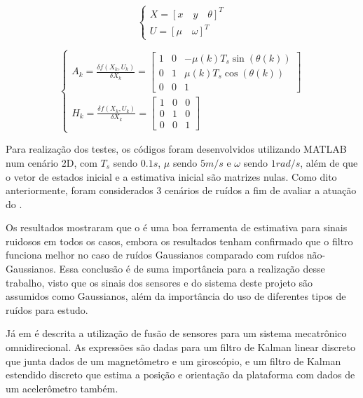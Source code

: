 \documentclass[acronym, symbols, table]{fei}
\begin{document}
\begin{equation}\label{eq:trab_relacionados_vetor_estados_1}
	\begin{cases}
		X = [x \quad y \quad \theta]^T \\
		U = [\mu \quad \omega]^T
	\end{cases}
\end{equation}

\begin{equation}\label{eq:trab_relacionados_matrizes_jacobianas}
	\begin{cases}
		A_k = \frac{\delta f(X_k, U_k)}{\delta X_k} = \begin{bmatrix}
			1 & 0 & -\mu(k)T_s\sin{(\theta(k))} \\
			0 & 1 & \mu(k)T_s\cos{(\theta(k))}  \\
			0 & 0 & 1
		\end{bmatrix} \\[30pt]
		
		H_k = \frac{\delta f(X_k, U_k)}{\delta X_k} = 
		\begin{bmatrix}
			1 & 0 & 0 \\
			0 & 1 & 0 \\
			0 & 0 & 1 
		\end{bmatrix}		
	\end{cases}
\end{equation}

Para realização dos testes, os códigos foram desenvolvidos utilizando MATLAB num cenário 2D, com $T_s$ sendo $0.1s$, $\mu$ sendo $5m/s$ e $\omega$ sendo $1rad/s$, além de que o vetor de estados inicial e a estimativa inicial são matrizes nulas. Como dito anteriormente, foram considerados 3 cenários de ruídos a fim de avaliar a atuação do .

Os resultados mostraram que o  é uma boa ferramenta de estimativa para sinais ruidosos em todos os casos, embora os resultados tenham confirmado que o filtro funciona melhor no caso de ruídos Gaussianos comparado com ruídos não-Gaussianos. Essa conclusão é de suma importância para a realização desse trabalho, visto que os sinais dos sensores e do sistema deste projeto são assumidos como Gaussianos, além da importância do uso de diferentes tipos de ruídos para estudo.

Já em \textcite{korotaj2021kalman} é descrita a utilização de fusão de sensores para um sistema mecatrônico omnidirecional. As expressões são dadas para um filtro de Kalman linear discreto que junta dados de um magnetômetro e um giroscópio, e um filtro de Kalman estendido discreto que estima a posição e orientação da plataforma com dados de um acelerômetro também.
\end{document}
